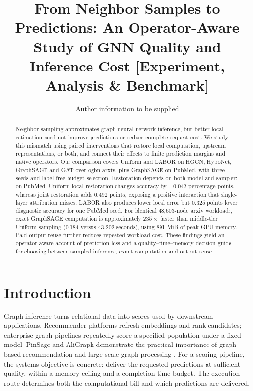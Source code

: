 \documentclass[sigconf, nonacm]{acmart}
\begin{document}
\title{From Neighbor Samples to Predictions: An Operator-Aware Study of GNN Quality and Inference Cost [Experiment, Analysis \& Benchmark]}
\author{Author information to be supplied}
\renewcommand{\shortauthors}{Author information to be supplied}
\begin{abstract}
Neighbor sampling approximates graph neural network inference, but better local estimation need not improve predictions or reduce complete request cost. We study this mismatch using paired interventions that restore local computation, upstream representations, or both, and connect their effects to finite prediction margins and native operators. Our comparison covers Uniform and LABOR on HGCN, HyboNet, GraphSAGE and GAT over ogbn-arxiv, plus GraphSAGE on PubMed, with three seeds and label-free budget selection. Restoration depends on both model and sampler: on PubMed, Uniform local restoration changes accuracy by $-0.042$ percentage points, whereas joint restoration adds $0.492$ points, exposing a positive interaction that single-layer attribution misses. LABOR also produces lower local error but $0.325$ points lower diagnostic accuracy for one PubMed seed. For identical 48,603-node arxiv workloads, exact GraphSAGE computation is approximately $235\times$ faster than middle-tier Uniform sampling (0.184 versus 43.202 seconds), using 891 MiB of peak GPU memory. Paid output reuse further reduces repeated-workload cost. These findings yield an operator-aware account of prediction loss and a quality--time--memory decision guide for choosing between sampled inference, exact computation and output reuse.
\end{abstract}
\maketitle
\vldbtopmatter

\section{Introduction}
Graph inference turns relational data into scores used by downstream applications. Recommender platforms refresh embeddings and rank candidates; enterprise graph pipelines repeatedly score a specified population under a fixed model. PinSage and AliGraph demonstrate the practical importance of graph-based recommendation and large-scale graph processing \cite{ying2018pinsage,zhu2019aligraph}. For a scoring pipeline, the systems objective is concrete: deliver the requested predictions at sufficient quality, within a memory ceiling and a completion-time budget. The execution route determines both the computational bill and which predictions are delivered.
\end{document}
